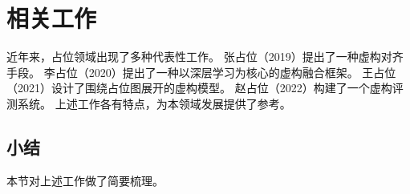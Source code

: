 \chapter{相关工作}
近年来，占位领域出现了多种代表性工作。
张占位（2019）提出了一种虚构对齐手段。
李占位（2020）提出了一种以深层学习为核心的虚构融合框架。
王占位（2021）设计了围绕占位图展开的虚构模型。
赵占位（2022）构建了一个虚构评测系统。
上述工作各有特点，为本领域发展提供了参考。

\section{小结}
本节对上述工作做了简要梳理。
